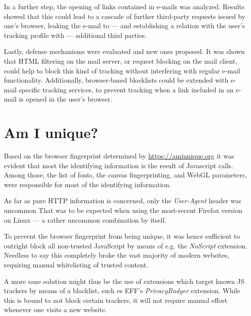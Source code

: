 \documentclass[a4paper]{scrreprt}
\begin{document}
In a further step, the opening of links contained in e-mails was analyzed.
Results showed that this could lead to a cascade of further third-party
requests issued by one's browser, leaking the e-mail to --- and establishing a
relation with the user's tracking profile with --- additional third parties.

Lastly, defense mechanisms were evaluated and new ones proposed. It was shown
that HTML filtering on the mail server, or request blocking on the mail client,
could help to block this kind of tracking without interfering with regular
e-mail functionality. Additionally, browser-based blocklists could be extended
with e-mail specific tracking services, to prevent tracking when a link
included in an e-mail is opened in the user's browser.

\section{Am I unique?}

Based on the browser fingerprint determined by
\href{https://amiunique.org}{https://amiunique.org} it was evident that most
the identifying information is the result of Javascript calls.  Among those,
the list of fonts, the canvas fingerprinting, and WebGL parameters, were
responsible for most of the identifying information.

As far as pure HTTP information is concerned, only the \emph{User-Agent} header
was uncommon That was to be expected when using the most-recent Firefox
version on Linux --- a rather uncommon combination by itself.

To prevent the browser fingerprint from being unique, it was hence sufficient
to outright block all non-trusted JavaScript by means of e.g. the
\emph{NoScript} extension. Needless to say this completely broke the vast
majority of modern websites, requiring manual whitelisting of trusted content.

A more sane solution might thus be the use of extensions which target known JS
trackers by means of a blacklist, such es EFF's \emph{PrivacyBadger} extension.
While this is bound to not block certain trackers, it will not require manual
effort whenever one visits a new website.

\printbibliography
\end{document}
